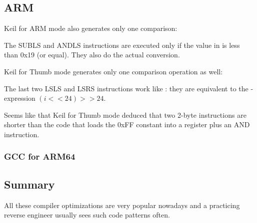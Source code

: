 \subsection{ARM}

\Optimizing Keil for ARM mode also generates only one comparison:



The SUBLS and ANDLS instructions are executed only if the value in  is less than 0x19 (or equal).
They also do the actual conversion.

\Optimizing Keil for Thumb mode generates only one comparison operation as well:



The last two LSLS and LSRS instructions work like :
they are equivalent to the \CCpp-expression $(i<<24)>>24$.

Seems like that Keil for Thumb mode deduced that two 2-byte instructions are shorter than the code 
that loads the 0xFF constant into a register plus an AND instruction.

\subsubsection{GCC for ARM64}





\subsection{Summary}

All these compiler optimizations are very popular nowadays 
and a practicing reverse engineer usually sees such code patterns often.

